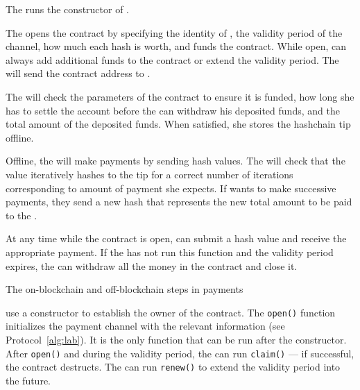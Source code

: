 \begin{Protocol*}[t!] \begin{framed} \footnotesize
\begin{compactlistn}
\item The \make runs the constructor of \ew.
\item The \make opens the contract by specifying the identity of \take, the validity period of the channel, how much each hash is worth, and funds the contract. While open, \make can always add additional funds to the contract or extend the validity period. The \make will send the contract address to \take. 
\item The \take will check the parameters of the contract to ensure it is funded, how long she has to settle the account before the \make can withdraw his deposited funds, and the total amount of the deposited funds. When satisfied, she stores the hashchain tip offline.
\item Offline, the \make will make payments by sending hash values. The \take will check that the value iteratively hashes to the tip for a correct number of iterations corresponding to amount of payment she expects. If \make wants to make successive payments, they send a new hash that represents the new total amount to be paid to the \take.
\item At any time while the contract is open, \take can submit a hash value and receive the appropriate payment. If the \take has not run this function and the validity period expires, the \make can withdraw all the money in the contract and close it. 
\end{compactlistn}
\normalsize \end{framed}
\caption{The on-blockchain and off-blockchain steps in \ew payments~\label{alg:lab}}
\end{Protocol*}

\ew use a constructor to establish the owner of the contract. The \texttt{open()} function initializes the payment channel with the relevant information (see Protocol~\ref{alg:lab}). It is the only function that can be run after the constructor. After \texttt{open()} and during the validity period, the \take can run \texttt{claim()} --- if successful, the contract destructs. The \make can run \texttt{renew()} to extend the validity period into the future. 

